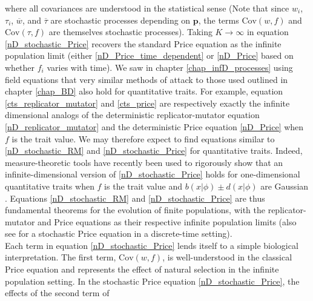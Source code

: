 where all covariances are understood in the statistical sense (Note that since $w_i$, $\tau_i$, $\overline{w}$, and $\overline{\tau}$ are stochastic processes depending on $\mathbf{p}$, the terms $\textrm{Cov}(w,f)$ and $\textrm{Cov}(\tau,f)$ are themselves stochastic processes). Taking $K \to \infty$ in equation \eqref{nD_stochastic_Price} recovers the standard Price equation as the infinite population limit (either \eqref{nD_Price_time_dependent} or \eqref{nD_Price} based on whether $f_i$ varies with time). We saw in chapter \ref{chap_infD_processes} using field equations that very similar methods of attack to those used outlined in chapter \eqref{chap_BD} also hold for quantitative traits. For example, equation \eqref{cts_replicator_mutator} and \eqref{cts_price} are respectively exactly the infinite dimensional analogs of the deterministic replicator-mutator equation \eqref{nD_replicator_mutator} and the deterministic Price equation \eqref{nD_Price} when $f$ is the trait value. We may therefore expect to find equations similar to \eqref{nD_stochastic_RM} and \eqref{nD_stochastic_Price} for quantitative traits. Indeed, measure-theoretic tools have recently been used to rigorously show that an infinite-dimensional version of \eqref{nD_stochastic_Price} holds for one-dimensional quantitative traits when $f$ is the trait value and $b(x|\phi) \pm d(x|\phi)$ are Gaussian \citep{week_white_2021}. Equations \eqref{nD_stochastic_RM} and \eqref{nD_stochastic_Price} are thus fundamental theorems for the evolution of finite populations, with the replicator-mutator and Price equations as their respective infinite population limits (also see \citep{rice_universal_2020} for a stochastic Price equation in a discrete-time setting).\\
Each term in equation \eqref{nD_stochastic_Price} lends itself to a simple biological interpretation. The first term, $\textrm{Cov}(w,f)$, is well-understood in the classical Price equation and represents the effect of natural selection in the infinite population setting. In the stochastic Price equation \eqref{nD_stochastic_Price}, the effects of the second term of 
